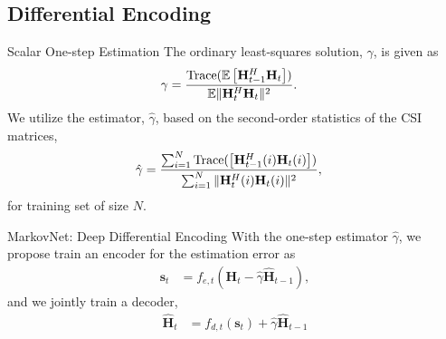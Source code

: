\documentclass{beamer}
\begin{document}
  \subsection{Differential Encoding}

  \begin{frame}{Scalar One-step Estimation}
    The ordinary least-squares solution, $\gamma$, is given as
    \begin{align*}
      \gamma &= \frac{\text{Trace}(\mathbb E\left[\mathbf H_{t-1}^H\mathbf H_{t}\right])}{\mathbb E\Arrowvert\mathbf H_t^H \mathbf H_t\Arrowvert^2}.
    \end{align*}
    \pause
    We utilize the estimator, $\hat \gamma$, based on the second-order statistics of the CSI matrices,
    \begin{align*}
      \hat \gamma &= \frac{\sum_{i=1}^N\text{Trace}(\left[\mathbf H_{t-1}^H(i)\mathbf H_{t}(i)\right])}{\sum_{i=1}^N\Arrowvert\mathbf H_t^H(i) \mathbf H_t(i)\Arrowvert^2},
    \end{align*}
    for training set of size $N$.
  \end{frame}

  \begin{frame}{MarkovNet: Deep Differential Encoding}
    With the one-step estimator $\hat\gamma$, we propose train an encoder for the estimation error as
    \begin{align*}
      \mathbf s_t &= f_{e,t} (\mathbf H_t - \hat \gamma \hat {\mathbf H}_{t-1}),
    \end{align*}
    and we jointly train a decoder,
    \begin{align*}
      \hat{\mathbf H}_t &= f_{d,t}(\mathbf s_t) + \hat\gamma\hat{\mathbf H}_{t-1}
    \end{align*}
  \end{frame}
\end{document}
